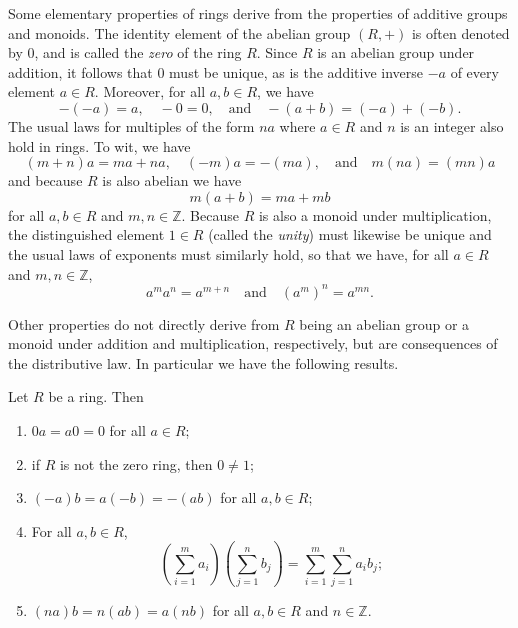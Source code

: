 Some elementary properties of rings derive from the properties of additive
groups and monoids. The identity element of the abelian group \((R, +)\) is
often denoted by \(0\), and is called the \emph{zero} of the ring \(R\). Since
\(R\) is an abelian group under addition, it follows that \(0\) must be unique,
as is the additive inverse \(-a\) of every element \(a \in R\). Moreover, for
all \(a, b \in R\), we have
\[
    -(-a) = a, \quad -0 = 0, \quad \text{and} \quad -(a + b) = (-a) + (-b).
\]
The usual laws for multiples of the form \(na\) where \(a \in R\) and \(n\) is
an integer also hold in rings. To wit, we have
\[
    (m+n)a = ma + na, \quad (-m)a = -(ma), \quad \text{and} \quad m(na) = (mn)a
\]
and because \(R\) is also abelian we have
\[
    m(a+b) = ma + mb
\]
for all \(a, b \in R\) and \(m, n \in \mathbb{Z}\). Because \(R\) is also a
monoid under multiplication, the distinguished element \(1 \in R\) (called the
\emph{unity}) must likewise be unique and the usual laws of exponents must
similarly hold, so that we have, for all \(a \in R\) and \(m, n \in
\mathbb{Z}\),
\[
    a^m a^n = a^{m+n} \quad \text{and} \quad (a^m)^n = a^{mn}.
\]

Other properties do not directly derive from \(R\) being an abelian group or a
monoid under addition and multiplication, respectively, but are consequences of
the distributive law. In particular we have the following results.

\begin{theorem}
    Let \(R\) be a ring. Then
    \begin{enumerate}[label={\normalfont(\alph*)}]
        \item \(0a = a0 = 0\) for all \(a \in R\);
        \item if \(R\) is not the zero ring, then \(0 \neq 1\);
        \item \((-a)b = a(-b) = -(ab)\) for all \(a, b \in R\);
        \item For all \(a, b \in R\),
        \[
            \left(\sum_{i=1}^{m} a_i\right)\left(\sum_{j=1}^{n} b_j\right) = \sum_{i=1}^{m} \sum_{j=1}^{n} a_i b_j;
        \]
        \item \((na)b = n(ab) = a(nb)\) for all \(a, b \in R\) and \(n \in
        \mathbb{Z}\).
    \end{enumerate}
\end{theorem}

